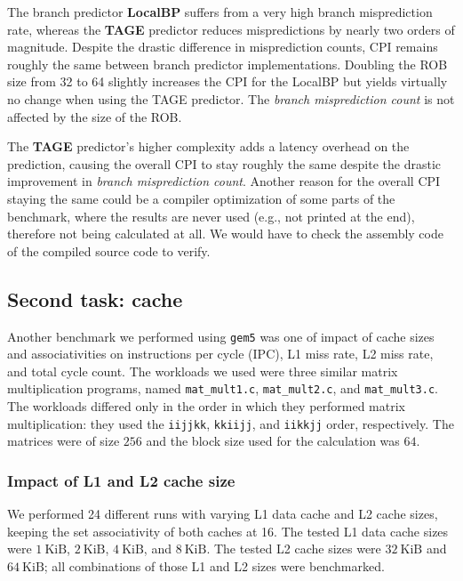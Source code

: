 \documentclass[10pt]{article}
\begin{document}
The branch predictor \textbf{LocalBP} suffers from a very high branch misprediction rate, whereas the \textbf{TAGE} predictor reduces mispredictions by nearly two orders of magnitude. Despite the drastic difference in misprediction counts, CPI remains roughly the same between branch predictor implementations. Doubling the ROB size from 32 to 64 slightly increases the CPI for the LocalBP but yields virtually no change when using the TAGE predictor. The \textit{branch misprediction count} is not affected by the size of the ROB.

The \textbf{TAGE} predictor's higher complexity adds a latency overhead on the prediction, causing the overall CPI to stay roughly the same despite the drastic improvement in \textit{branch misprediction count}. Another reason for the overall CPI staying the same could be a compiler optimization of some parts of the benchmark, where the results are never used (e.g., not printed at the end), therefore not being calculated at all. We would have to check the assembly code of the compiled source code to verify.



\subsection{Second task: cache}
Another benchmark we performed using \texttt{gem5} was one of impact of cache sizes and associativities on instructions per cycle (IPC), L1 miss rate, L2 miss rate, and total cycle count. The workloads we used were three similar matrix multiplication programs, named \texttt{mat\_mult1.c}, \texttt{mat\_mult2.c}, and \texttt{mat\_mult3.c}. The workloads differed only in the order in which they performed matrix multiplication: they used the \texttt{iijjkk}, \texttt{kkiijj}, and \texttt{iikkjj} order, respectively. The matrices were of size $256$ and the block size used for the calculation was $64$.


\subsubsection{Impact of L1 and L2 cache size}
We performed 24 different runs with varying L1 data cache and L2 cache sizes, keeping the set associativity of both caches at 16. The tested L1 data cache sizes were $1~\text{KiB}$, $2~\text{KiB}$, $4~\text{KiB}$, and $8~\text{KiB}$. The tested L2 cache sizes were $32~\text{KiB}$ and $64~\text{KiB}$; all combinations of those L1 and L2 sizes were benchmarked.
\end{document}
